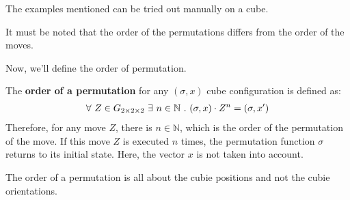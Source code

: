 The examples mentioned can be tried out manually on a \Ttwo cube.
\begin{note}
It must be noted that the order of the permutations differs from the order of the moves.
\end{note}

Now, we'll define the order of permutation. 
\begin{definition}
    

  
The \textbf{order of a permutation} for any $(\sigma, x)$ cube configuration is defined as: 
\begin{align*}
\forall \ Z \in G_{2\times 2\times 2} \ \exists \ n \in \mathbb{N} \ . \ (\sigma, x) \cdot Z^n = (\sigma, x')
\end{align*}
Therefore, for any move $Z$, there is $n \in \mathbb{N}$, which is the order of the permutation of the move. If this move $Z$ is executed $n$ times, the permutation function $\sigma$ returns to its initial state. Here, the vector $x$ is not taken into account.
\end{definition}
\begin{note}
    The order of a permutation is all about the cubie positions and not the cubie orientations.
\end{note}
